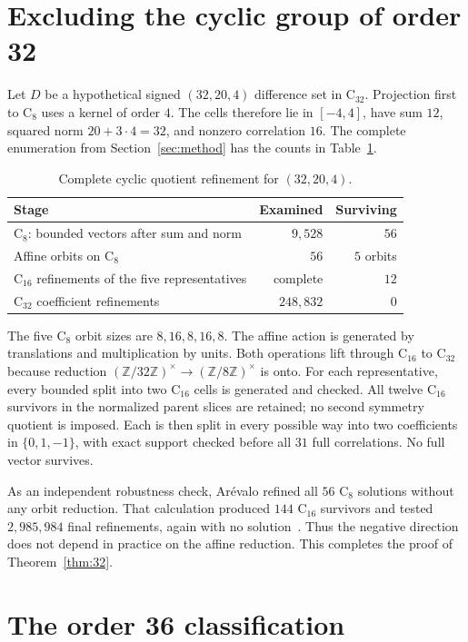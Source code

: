 \documentclass[11pt]{article}
\theoremstyle{remark}
\newcommand{\Z}{\mathbb{Z}}
\newcommand{\C}{\mathrm{C}}
\begin{document}
\section{Excluding the cyclic group of order 32}\label{sec:c32}

Let $D$ be a hypothetical signed $(32,20,4)$ difference set in $\C_{32}$.
Projection first to $\C_8$ uses a kernel of order $4$.  The cells therefore
lie in $[-4,4]$, have sum $12$, squared norm
$20+3\cdot4=32$, and nonzero correlation $16$.  The complete enumeration
from Section~\ref{sec:method} has the counts in Table~\ref{tab:c32}.

\begin{table}[ht]
\centering
\caption{Complete cyclic quotient refinement for $(32,20,4)$.}
\label{tab:c32}
\begin{tabular}{@{}lrr@{}}
\toprule
Stage & Examined & Surviving\\
\midrule
$\C_8$: bounded vectors after sum and norm & $9{,}528$ & $56$\\
Affine orbits on $\C_8$ & $56$ & $5$ orbits\\
$\C_{16}$ refinements of the five representatives & complete & $12$\\
$\C_{32}$ coefficient refinements & $248{,}832$ & $0$\\
\bottomrule
\end{tabular}
\end{table}

The five $\C_8$ orbit sizes are $8,16,8,16,8$.  The affine action is generated
by translations and multiplication by units.  Both operations lift through
$\C_{16}$ to $\C_{32}$ because reduction
$(\Z/32\Z)^\times\to(\Z/8\Z)^\times$ is onto.  For each representative, every
bounded split into two $\C_{16}$ cells is generated and checked.  All twelve
$\C_{16}$ survivors in the normalized parent slices are retained; no second
symmetry quotient is imposed.  Each is then split in every possible way into
two coefficients in $\{0,1,-1\}$, with exact support checked before all $31$
full correlations.  No full vector survives.

As an independent robustness check, Ar\'evalo refined all $56$ $\C_8$
solutions without any orbit reduction.  That calculation produced $144$
$\C_{16}$ survivors and tested $2{,}985{,}984$ final refinements, again with
no solution~\cite{arevalo-review}.  Thus the negative direction does not
depend in practice on the affine reduction.  This completes the proof of
Theorem~\ref{thm:32}.

\section{The order 36 classification}\label{sec:v36}
\end{document}
